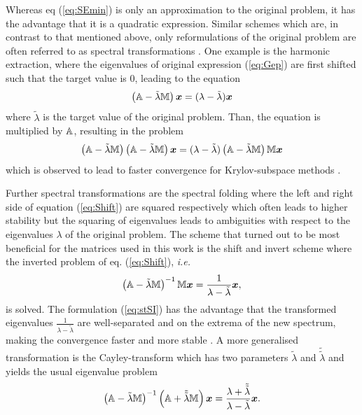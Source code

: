 Whereas eq (\ref{eq:SEmin}) is only an approximation to the original problem, it has the advantage that it is a quadratic expression.
Similar schemes which are, in contrast to that mentioned above, only reformulations of the original problem are often referred to as spectral transformations \cite{slepcManual}.
One example is the harmonic extraction, where the eigenvalues of original expression (\ref{eq:Gep}) are first shifted such that the target value is $0$, leading to the equation 
\begin{equation} \label{eq:Shift}
\left(\mathbb{A}-\tilde{\lambda}\mathbb{M}\right)\bm{x}=(\lambda-\tilde{\lambda})\bm{x}
\end{equation}
where $\tilde{\lambda}$ is the target value of the original problem.
Than, the equation is multiplied by $\mathbb{A}$, resulting in the problem 
\begin{equation}
\left(\mathbb{A}-\tilde{\lambda}\mathbb{M}\right)\left(\mathbb{A}-\tilde{\lambda}\mathbb{M}\right)\bm{x}=(\lambda-\tilde{\lambda})\left(\mathbb{A}-\tilde{\lambda}\mathbb{M}\right)\mathbb{M}\bm{x}
\end{equation}
which is observed to lead to faster convergence for Krylov-subspace methods \cite{slepcManual}.

Further spectral transformations are the spectral folding \cite{slepcManual} where the left and right side of equation (\ref{eq:Shift}) are squared respectively which often leads to higher stability but the squaring of eigenvalues leads to ambiguities with respect to the eigenvalues $\lambda$ of the original problem.
The scheme that turned out to be most beneficial for the matrices used in this work is the shift and invert scheme where the inverted problem of eq. (\ref{eq:Shift}), \textit{i.e.}
\begin{equation}\label{eq:stSI}
\left(\mathbb{A}-\tilde{\lambda}\mathbb{M}\right)^{-1}\mathbb{M}\bm{x}=\frac{1}{\lambda-\tilde{\lambda}}\bm{x},
\end{equation}
is solved. 
The formulation (\ref{eq:stSI}) has the advantage that the transformed eigenvalues $\frac{1}{\lambda-\tilde{\lambda}}$ are well-separated and on the extrema of the new spectrum, making the convergence faster and more stable \cite{str-7}.
A more generalised transformation is the Cayley-transform which has two parameters $\tilde{\lambda}$ and $\tilde{\tilde{\lambda}}$ and yields the usual eigenvalue problem
\begin{equation}
\left(\mathbb{A}-\tilde{\lambda}\mathbb{M}\right)^{-1}\left(\mathbb{A}+\tilde{\tilde{\lambda}}\mathbb{M}\right)\bm{x}=\frac{\lambda+\tilde{\tilde{\lambda}}}{\lambda-\tilde{\lambda}}\bm{x}.
\end{equation}

